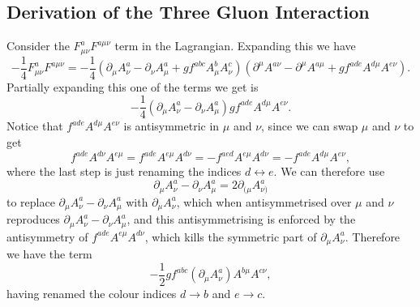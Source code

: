 \documentclass[fleqn]{NotesClass}
\begin{document}
    \subsection{Derivation of the Three Gluon Interaction}
    Consider the \(F^a_{\mu\nu}F^{a\mu\nu}\) term in the Lagrangian.
    Expanding this we have
    \begin{equation*}
        -\frac{1}{4}F^a_{\mu\nu}F^{a\mu\nu} = -\frac{1}{4}(\partial_\mu A^a_\nu - \partial_\nu A^a_\mu + gf^{abc}A^b_\mu A^c_\nu)(\partial^\mu A^{a\nu} - \partial^\mu A^{a\mu} + gf^{ade}A^{d\mu}A^{e\nu}).
    \end{equation*}
    Partially expanding this one of the terms we get is
    \begin{equation}
        -\frac{1}{4}(\partial_\mu A^a_\nu - \partial_\nu A^a_\mu)gf^{ade}A^{d\mu}A^{e\nu}.
    \end{equation}
    Notice that \(f^{ade}A^{d\mu}A^{e\nu}\) is antisymmetric in \(\mu\) and \(\nu\), since we can swap \(\mu\) and \(\nu\) to get
    \begin{equation}
        f^{ade}A^{d\nu}A^{e\mu} = f^{ade}A^{e\mu}A^{d\nu} = -f^{aed}A^{e\mu}A^{d\nu} = -f^{ade}A^{d\mu}A^{e\nu},
    \end{equation}
    where the last step is just renaming the indices \(d \leftrightarrow e\).
    We can therefore use
    \begin{equation}
        \partial_\mu A^a_\nu - \partial_\nu A^a_\mu = 2 \partial_{(\mu} A^a_{\nu)}
    \end{equation}
    to replace \(\partial_\mu A^a_\nu - \partial_\nu A^a_\mu\) with \(\partial_\mu A^a_\nu\), which when antisymmetrised over \(\mu\) and \(\nu\) reproduces \(\partial_\mu A^a_\nu - \partial_\nu A^a_\mu\), and this antisymmetrising is enforced by the antisymmetry of \(f^{ade}A^{e\mu}A^{d\nu}\), which kills the symmetric part of \(\partial_\mu A^a_\nu\).
    Therefore we have the term
    \begin{equation}
        -\frac{1}{2} g f^{abc} (\partial_\mu A^a_\nu)A^{b\mu}A^{c\nu},
    \end{equation}
    having renamed the colour indices \(d \to b\) and \(e \to c\).
    
\end{document}
